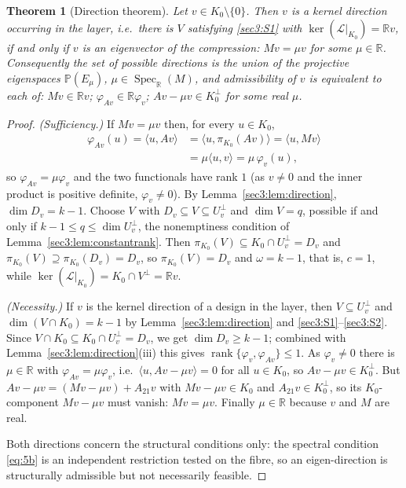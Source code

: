 \documentclass[journal]{IEEEtran}
\theoremstyle{plainn}
\newtheorem{thm}{Theorem}
\theoremstyle{remark}
\newcommand{\rank}{\operatorname{rank}}
\begin{document}
\begin{thm}[Direction theorem]
\label{sec3:thm:direction}
\label{sec3:rem:direction-set}
\label{sec3:rem:equiv}
Let $v\in K_0\setminus\{0\}$. Then $v$ is a kernel direction occurring in the layer, i.e.\ there is
$V$ satisfying \ref{sec3:S1} with $\ker(\mathcal{L}|_{K_0})=\mathbb{R} v$, if and only if $v$ is an
eigenvector of the compression: $Mv=\mu v$ for some $\mu\in\mathbb{R}$. Consequently the set of
possible directions is the union of the projective eigenspaces
$\mathbb{P}(E_\mu)$, $\mu\in\operatorname{Spec}_{\mathbb{R}}(M)$, and admissibility of $v$ is
equivalent to each of: $Mv\in\mathbb{R} v$; $\varphi_{Av}\in\mathbb{R}\varphi_v$; $Av-\mu v\in K_0^\perp$
for some real $\mu$.
\end{thm}
\begin{proof}
\emph{(Sufficiency.)} If $Mv=\mu v$ then, for every $u\in K_0$,
\begin{align*}
\varphi_{Av}(u)=\langle u,Av\rangle
&=\langle u,\pi_{K_0}(Av)\rangle=\langle u,Mv\rangle\\
&=\mu\langle u,v\rangle=\mu\,\varphi_v(u),
\end{align*}
so $\varphi_{Av}=\mu\varphi_v$ and the two functionals have rank $1$ (as $v\neq0$ and the inner product
is positive definite, $\varphi_v\neq0$). By Lemma~\ref{sec3:lem:direction}, $\dim D_v=k-1$. Choose $V$
with $D_v\subseteq V\subseteq U_v^\perp$ and $\dim V=q$, possible if and only if
$k-1\le q\le\dim U_v^\perp$, the nonemptiness condition of Lemma~\ref{sec3:lem:constantrank}. Then
$\pi_{K_0}(V)\subseteq K_0\cap U_v^\perp=D_v$ and $\pi_{K_0}(V)\supseteq\pi_{K_0}(D_v)=D_v$, so
$\pi_{K_0}(V)=D_v$ and $\omega=k-1$, that is, $c=1$, while
$\ker(\mathcal{L}|_{K_0})=K_0\cap V^\perp=\mathbb{R} v$.

\emph{(Necessity.)} If $v$ is the kernel direction of a design in the layer, then
$V\subseteq U_v^\perp$ and $\dim(V\cap K_0)=k-1$ by Lemma~\ref{sec3:lem:direction} and
\ref{sec3:S1}--\ref{sec3:S2}. Since $V\cap K_0\subseteq K_0\cap U_v^\perp=D_v$, we get
$\dim D_v\ge k-1$; combined with Lemma~\ref{sec3:lem:direction}(iii) this gives
$\rank\{\varphi_v,\varphi_{Av}\}\le1$. As
$\varphi_v\neq0$ there is $\mu\in\mathbb{R}$ with $\varphi_{Av}=\mu\varphi_v$, i.e.\
$\langle u,Av-\mu v\rangle=0$ for all $u\in K_0$, so $Av-\mu v\in K_0^\perp$. But
$Av-\mu v=(Mv-\mu v)+A_{21}v$ with $Mv-\mu v\in K_0$ and $A_{21}v\in K_0^\perp$, so its
$K_0$-component $Mv-\mu v$ must vanish: $Mv=\mu v$. Finally $\mu\in\mathbb{R}$ because $v$ and $M$ are
real.

Both directions concern the structural conditions only: the spectral condition \eqref{eq:5b} is an
independent restriction tested on the fibre, so an eigen-direction is structurally admissible but not
necessarily feasible.
\end{proof}
\end{document}
